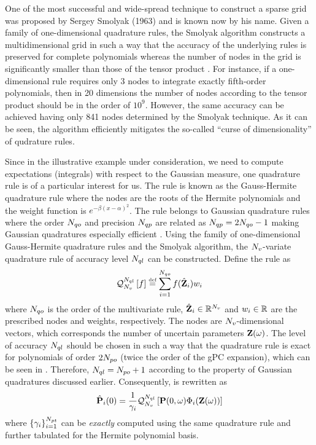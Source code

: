 One of the most successful and wide-spread technique to construct a sparse grid was proposed by Sergey Smolyak (1963) and is known now by his name. Given a family of one-dimensional quadrature rules, the Smolyak algorithm constructs a multidimensional grid in such a way that the accuracy of the underlying rules is preserved for complete polynomials whereas the number of nodes in the grid is significantly smaller than those of the tensor product \cite{heiss2008, eldred2009}. For instance, if a one-dimensional rule requires only 3 nodes to integrate exactly fifth-order polynomials, then in 20 dimensions the number of nodes according to the tensor product should be in the order of $10^9$. However, the same accuracy can be achieved having only 841 nodes determined by the Smolyak technique. As it can be seen, the algorithm efficiently mitigates the so-called ``curse of dimensionality'' of qudrature rules.

Since in the illustrative example under consideration, we need to compute expectations (integrals) with respect to the Gaussian measure, one quadrature rule is of a particular interest for us. The rule is known as the Gauss-Hermite quadrature rule where the nodes are the roots of the Hermite polynomials and the weight function is $e^{-\beta (x - \alpha)^2}$. The rule belongs to Gaussian quadrature rules where the order $N_{qo}$ and precision $N_{qp}$ are related as $N_{qp} = 2 N_{qo} - 1$ making Gaussian quadratures especially efficient \cite{heiss2008}. Using the family of one-dimensional Gauss-Hermite quadrature rules and the Smolyak algorithm, the ${N_v}$-variate quadrature rule of accuracy level $N_{ql}$ can be constructed. Define the rule as
\[
  \mathcal{Q}_{{N_v}}^{N_{ql}}\left[f\right] \stackrel{\text{\tiny def}}{=} \sum_{i = 1}^{N_{qo}} f(\hat{\mathbf{Z}}_i) w_i
\]
where $N_{qo}$ is the order of the multivariate rule, $\hat{\mathbf{Z}}_i \in \mathbb{R}^{N_v}$ and $w_i \in \mathbb{R}$ are the prescribed nodes and weights, respectively. The nodes are ${N_v}$-dimensional vectors, which corresponds the number of uncertain parameters $\mathbf{Z}(\omega)$. The level of accuracy $N_{ql}$ should be chosen in such a way that the quadrature rule is exact for polynomials of order $2 {N_{po}}$ (twice the order of the gPC expansion), which can be seen in . Therefore, $N_{ql} = {N_{po}} + 1$ according to the property of Gaussian quadratures discussed earlier. Consequently,  is rewritten as
\[
  \hat{\mathbf{P}}_i(0) = \frac{1}{\gamma_i} \mathcal{Q}_{{N_v}}^{N_{ql}}\left[\mathbf{P}(0, \omega) \Phi_i(\mathbf{Z}(\omega))\right]
\]
where $\{ \gamma_i \}_{i = 1}^{{N_{pt}}}$ can be \emph{exactly} computed using the same quadrature rule and further tabulated for the Hermite polynomial basis.
